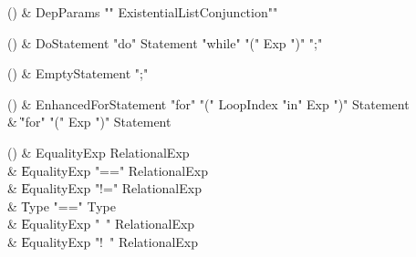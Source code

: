 \begin{bbgrammarappendix}

() & DepParams \label{prod:DepParams}  \: \xcd"{" ExistentialList\opt Conjunction\opt \xcd"}"  \\


\end{bbgrammarappendix}

\begin{bbgrammarappendix}

() & DoStatement \label{prod:DoStatement}  \: \xcd"do" Statement \xcd"while" \xcd"(" Exp \xcd")" \xcd";"  \\


\end{bbgrammarappendix}

\begin{bbgrammarappendix}

() & EmptyStatement \label{prod:EmptyStatement}  \: \xcd";"  \\


\end{bbgrammarappendix}

\begin{bbgrammarappendix}

() & EnhancedForStatement \label{prod:EnhancedForStatement}  \: \xcd"for" \xcd"(" LoopIndex \xcd"in" Exp \xcd")" Statement  \\

 &    \| \xcd"for" \xcd"(" Exp \xcd")" Statement \\

\end{bbgrammarappendix}

\begin{bbgrammarappendix}

() & EqualityExp \label{prod:EqualityExp}  \: RelationalExp  \\

 &    \| EqualityExp \xcd"==" RelationalExp \\
 &    \| EqualityExp \xcd"!=" RelationalExp \\
 &    \| Type  \xcd"==" Type  \\
 &    \| EqualityExp \xcd"~" RelationalExp \\
 &    \| EqualityExp \xcd"!~" RelationalExp \\

\end{bbgrammarappendix}


